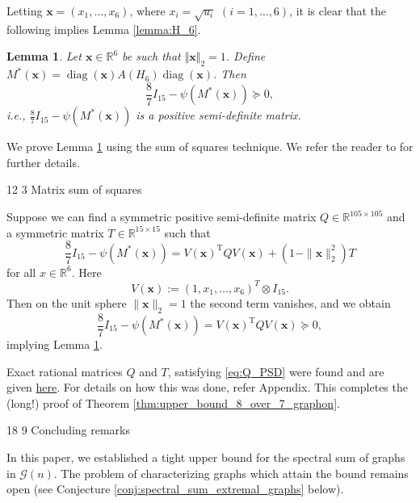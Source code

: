 \documentclass[11pt]{article}
\makeatletter
\renewcommand\section{\@startsection{section}{1}{\z@}%
{18\p@ \@plus 6\p@ \@minus 3\p@}%
{9\p@ \@plus 6\p@ \@minus 3\p@}%
{\large\bfseries\boldmath}}
\renewcommand\subsection{\@startsection{subsection}{2}{\z@}%
{12\p@ \@plus 6\p@ \@minus 3\p@}%
{3\p@ \@plus 6\p@ \@minus 3\p@}%
{\bfseries\boldmath}}
\theoremstyle{plain}
\newtheorem{lemma}[theorem]{Lemma}
\theoremstyle{definition}
\numberwithin{equation}{section}
\DeclareMathOperator{\diag}{diag}
\makeatother
\begin{document}
Letting $\bm{x} = (x_1, \ldots, x_6)$, where $x_i = \sqrt{u_i}$ $(i =1, \ldots, 6)$, 
it is clear that the following implies Lemma \ref{lemma:H_6}.

\begin{lemma}\label{lemma:H_6_x} 
Let $\bm{x}\in \mathbb{R}^6$ be such that $\Vert \bm{x} \Vert_2 = 1$. 
Define $M^*(\bm{x}) = \diag(\bm{x}) A(H_6) \diag(\bm{x})$. Then
\[  
\frac87 I_{15}-\psi(M^*(\bm{x}))\succeq 0,
\]
i.e., $\frac87 I_{15}-\psi(M^*(\bm{x}))$ is a positive semi-definite matrix.
\end{lemma}

We prove Lemma \ref{lemma:H_6_x} using the sum of squares technique. 
We refer the reader to \cite{Parrilo_Thomas_2020} for further details.

\subsection{Matrix sum of squares}

Suppose we can find a symmetric positive semi-definite matrix $Q \in \mathbb{R}^{105 \times 105}$ 
and a symmetric matrix $T \in \mathbb{R}^{15 \times 15}$ such that
\begin{equation}\label{eq:Q_PSD}
\frac87 I_{15}-\psi(M^*(\bm{x})) = V(\bm{x})^{\mathrm{T}} QV(\bm{x})+(1-\|\bm{x}\|_2^2)T 
\end{equation}
for all $x\in \mathbb{R}^6$. Here 
\[ 
V(\bm{x}):= (1,x_1,\dots,x_6)^T\otimes I_{15}. 
\]
Then on the unit sphere
$\|\bm{x}\|_2=1$ the second term vanishes, and we obtain
\[ 
\frac87 I_{15}-\psi(M^*(\bm{x})) = V(\bm{x})^{\mathrm{T}} QV(\bm{x})\succeq 0, 
\]
implying Lemma \ref{lemma:H_6_x}. 

Exact rational matrices $Q$ and $T$, satisfying \ref{eq:Q_PSD} were found and are given \href{https://github.com/Shivaramkratos/Spectral_sum_codes/blob/main/verify_sos_identity.py}{here}. 
For details on how this was done, refer Appendix. This completes the (long!) proof of 
Theorem \ref{thm:upper_bound_8_over_7_graphon}.

\section{Concluding remarks}

In this paper, we established a tight upper bound for the spectral sum of graphs in $\mathcal{G}(n)$. 
The problem of characterizing graphs which attain the bound remains open 
(see Conjecture \ref{conj:spectral_sum_extremal_graphs} below).
\end{document}
